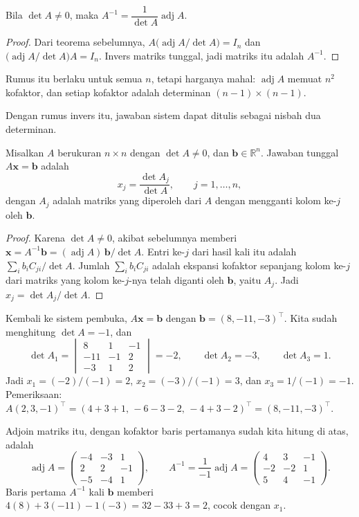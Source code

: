 \begin{akibat}
Bila $\det A\neq0$, maka $A^{-1}=\dfrac{1}{\det A}\operatorname{adj}A$.
\end{akibat}

\begin{proof}
Dari teorema sebelumnya, $A\bigl(\operatorname{adj}A/\det A\bigr)=I_{n}$ dan
$\bigl(\operatorname{adj}A/\det A\bigr)A=I_{n}$. Invers matriks tunggal, jadi matriks itu
adalah $A^{-1}$.
\end{proof}

Rumus itu berlaku untuk semua $n$, tetapi harganya mahal: $\operatorname{adj}A$ memuat
$n^{2}$ kofaktor, dan setiap kofaktor adalah determinan $(n-1)\times(n-1)$.

Dengan rumus invers itu, jawaban sistem dapat ditulis sebagai nisbah dua determinan.

\begin{teorema}
Misalkan $A$ berukuran $n\times n$ dengan $\det A\neq0$, dan $\mathbf{b}\in\mathbb{R}^{n}$.
Jawaban tunggal $A\mathbf{x}=\mathbf{b}$ adalah
\[
  x_{j}=\frac{\det A_{j}}{\det A},\qquad j=1,\dots,n,
\]
dengan $A_{j}$ adalah matriks yang diperoleh dari $A$ dengan mengganti kolom ke-$j$ oleh
$\mathbf{b}$.
\end{teorema}

\begin{proof}
Karena $\det A\neq0$, akibat sebelumnya memberi
$\mathbf{x}=A^{-1}\mathbf{b}=(\operatorname{adj}A)\,\mathbf{b}/\det A$. Entri ke-$j$ dari
hasil kali itu adalah $\sum_{i}b_{i}C_{ji}/\det A$. Jumlah $\sum_{i}b_{i}C_{ji}$ adalah
ekspansi kofaktor sepanjang kolom ke-$j$ dari matriks yang kolom ke-$j$-nya telah diganti
oleh $\mathbf{b}$, yaitu $A_{j}$. Jadi $x_{j}=\det A_{j}/\det A$.
\end{proof}

\begin{contoh}
Kembali ke sistem pembuka, $A\mathbf{x}=\mathbf{b}$ dengan
$\mathbf{b}=(8,-11,-3)^{\top}$. Kita sudah menghitung $\det A=-1$, dan
\[
  \det A_{1}=\begin{vmatrix}8&1&-1\\ -11&-1&2\\ -3&1&2\end{vmatrix}=-2,\qquad
  \det A_{2}=-3,\qquad \det A_{3}=1 .
\]
Jadi $x_{1}=(-2)/(-1)=2$, $x_{2}=(-3)/(-1)=3$, dan $x_{3}=1/(-1)=-1$. Pemeriksaan:
$A(2,3,-1)^{\top}=(4+3+1,\,-6-3-2,\,-4+3-2)^{\top}=(8,-11,-3)^{\top}$.

Adjoin matriks itu, dengan kofaktor baris pertamanya sudah kita hitung di atas, adalah
\[
  \operatorname{adj}A=\begin{pmatrix}-4&-3&1\\ 2&2&-1\\ -5&-4&1\end{pmatrix},
  \qquad
  A^{-1}=\frac{1}{-1}\operatorname{adj}A
  =\begin{pmatrix}4&3&-1\\ -2&-2&1\\ 5&4&-1\end{pmatrix}.
\]
Baris pertama $A^{-1}$ kali $\mathbf{b}$ memberi $4(8)+3(-11)-1(-3)=32-33+3=2$, cocok
dengan $x_{1}$.
\end{contoh}


